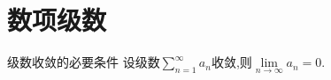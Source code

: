 \chapter{数项级数}

\begin{corollary}{级数收敛的必要条件}
	设级数$
		\sum_{n=1}^{\infty}{a_n}
	$收敛,则$
		\lim\limits_{n\rightarrow \infty}a_n=0
	$.
\end{corollary}
